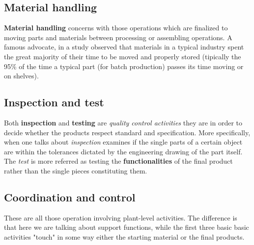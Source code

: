 \subsection{Material handling}
\textbf{Material handling} concerns with those operations which are finalized to moving parts and materials between processing or assembling operations. A famous advocate, in a study observed that materials in a typical industry spent the great majority of their time to be moved and properly stored (tipically the 95\% of the time a typical part (for batch production) passes its time moving or on shelves).
\subsection{Inspection and test}
Both \textbf{inspection} and \textbf{testing} are \textit{quality control activities} they are in order to decide whether the products respect standard and specification. More specifically, when one talks about \textit{inspection} examines if the single parts of a certain object are within the tolerances dictated by the engineering drawing of the part itself. The \textit{test} is more referred as testing the \textbf{functionalities} of the final product rather than the single pieces constituting them. 

\subsection{Coordination and control}
These are all those operation involving plant-level activities. The difference is that here we are talking about support functions, while the first three basic basic activities "touch" in some way either the starting material or the final products.

